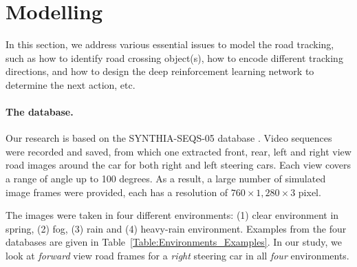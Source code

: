 \documentclass{svproc}
\begin{document}
	\section{Modelling}
	In this section, we address various essential issues to model the road tracking, such as how to identify road crossing object(s), how to encode different tracking directions, and how to design the deep reinforcement learning network to determine the next action, etc. 
	
	\paragraph{The database.} Our research is based on the SYNTHIA-SEQS-05 database \cite{Ros2016TheSYNTHIA}. Video sequences were recorded and saved, from which one extracted front, rear, left and right view road images around the car for both right and left steering cars. Each view covers a range of angle up to 100 degrees. As a result, a large number of simulated image frames were provided, each has a resolution of $760 \times 1,280 \times 3$ pixel. 
	
	The images were taken in four different environments: (1) clear environment in spring, (2) fog, (3) rain and (4) heavy-rain environment. Examples from the four databases are given in Table~\ref{Table:Environments_Examples}.	In our study, we look at \emph{forward} view road frames for a \emph{right} steering car in all \emph{four} environments. 
	
\end{document}
